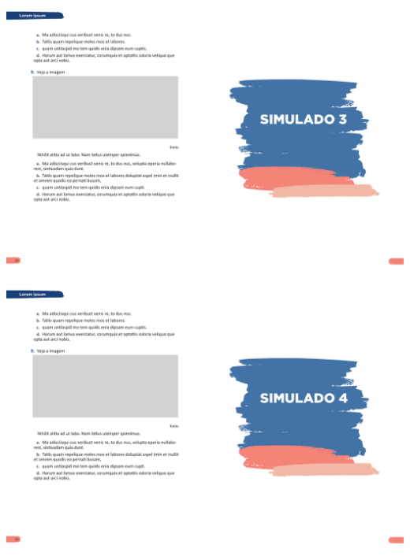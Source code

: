 \blankpage
\vspace*{-3.4cm}
\hspace*{-3.7cm}\includegraphics[scale=1]{../watermarks/3simulado5ano.pdf}


\vspace*{-3.4cm}
\hspace*{-3.7cm}\includegraphics[scale=1]{../watermarks/4simulado5ano.pdf}


%



